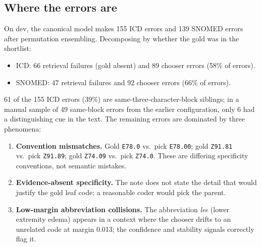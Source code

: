 \documentclass[11pt]{article}
\newcommand{\code}[1]{\texttt{#1}}
\begin{document}
\subsection{Where the errors are}
On dev, the canonical model makes 155 ICD errors and 139 SNOMED errors after permutation
ensembling. Decomposing by whether the gold was in the shortlist:
\begin{itemize}[leftmargin=1.2em]
  \item ICD: 66 retrieval failures (gold absent) and 89 chooser errors (58\% of errors).
  \item SNOMED: 47 retrieval failures and 92 chooser errors (66\% of errors).
\end{itemize}
61 of the 155 ICD errors (39\%) are same-three-character-block siblings; in a manual
sample of 49 same-block errors from the earlier configuration, only 6 had a distinguishing
cue in the text. The remaining errors are
dominated by three phenomena:
\begin{enumerate}[leftmargin=1.2em]
  \item \textbf{Convention mismatches.} Gold \code{E78.0} vs.\ pick \code{E78.00}; gold
  \code{Z91.81} vs.\ pick \code{Z91.89}; gold \code{Z74.09} vs.\ pick \code{Z74.0}. These
  are differing specificity conventions, not semantic mistakes.
  \item \textbf{Evidence-absent specificity.} The note does not state the detail that would
  justify the gold leaf code; a reasonable coder would pick the parent.
  \item \textbf{Low-margin abbreviation collisions.} The abbreviation \emph{lee} (lower
  extremity edema) appears in a context where the chooser drifts to an unrelated code at
  margin 0.013; the confidence and stability signals correctly flag it.
\end{enumerate}
\end{document}
